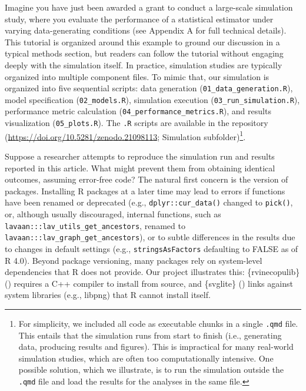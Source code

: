 \documentclass[
  man,
  longtable,
  nolmodern,
  notxfonts,
  notimes,
  colorlinks=true,linkcolor=blue,citecolor=blue,urlcolor=blue]{apa7}
\begin{document}
Imagine you have just been awarded a grant to conduct a large-scale
simulation study, where you evaluate the performance of a statistical
estimator under varying data-generating conditions (see Appendix A for
full technical details). This tutorial is organized around this example
to ground our discussion in a typical methods section, but readers can
follow the tutorial without engaging deeply with the simulation itself.
In practice, simulation studies are typically organized into multiple
component files. To mimic that, our simulation is organized into five
sequential scripts: data generation (\texttt{01\_data\_generation.R}),
model specification (\texttt{02\_models.R}), simulation execution
(\texttt{03\_run\_simulation.R}), performance metric calculation
(\texttt{04\_performance\_metrics.R}), and results visualization
(\texttt{05\_plots.R}). The \texttt{.R} scripts are available in the
repository (\url{https://doi.org/10.5281/zenodo.21098113}; Simulation
subfolder)\footnote{For simplicity, we included all code as executable
  chunks in a single \texttt{.qmd} file. This entails that the
  simulation runs from start to finish (i.e., generating data, producing
  results and figures). This is impractical for many real-world
  simulation studies, which are often too computationally intensive. One
  possible solution, which we illustrate, is to run the simulation
  outside the \texttt{.qmd} file and load the results for the analyses
  in the same file.}.

Suppose a researcher attempts to reproduce the simulation run and
results reported in this article. What might prevent them from obtaining
identical outcomes, assuming error-free code? The natural first concern
is the version of packages. Installing R packages at a later time may
lead to errors if functions have been renamed or deprecated (e.g.,
\texttt{dplyr::cur\_data()} changed to \texttt{pick()}, or, although
usually discouraged, internal functions, such as
\texttt{lavaan:::lav\_utils\_get\_ancestors}, renamed to
\texttt{lavaan:::lav\_graph\_get\_ancestors}), or to subtle differences
in the results due to changes in default settings (e.g.,
\texttt{stringsAsFactors} defaulting to FALSE as of R 4.0). Beyond
package versioning, many packages rely on system-level dependencies that
R does not provide. Our project illustrates this: \{rvinecopulib\}
() requires a C++
compiler to install from source, and \{svglite\}
() links against system
libraries (e.g., libpng) that R cannot install itself.
\end{document}
